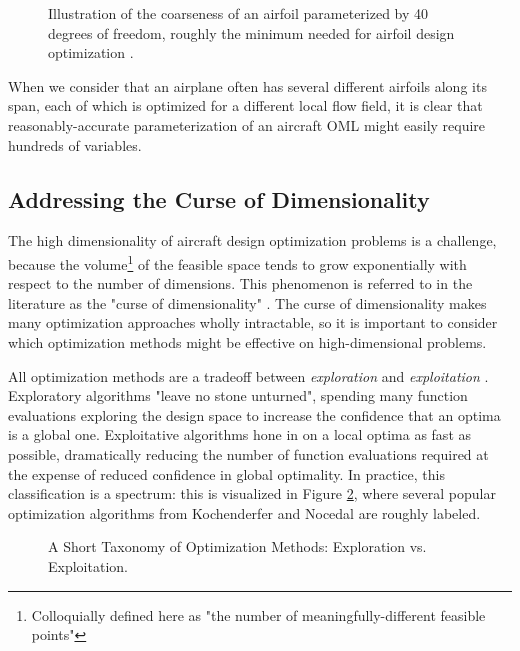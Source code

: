 \begin{figure}[H]
    \centering
    \ifdraft{}{}
    \caption{Illustration of the coarseness of an airfoil parameterized by 40 degrees of freedom\protect\footnotemark, roughly the minimum needed for airfoil design optimization \cite{masters2017}.}
    \label{fig:airfoil-fig}
\end{figure}

When we consider that an airplane often has several different airfoils along its span, each of which is optimized for a different local flow field, it is clear that reasonably-accurate parameterization of an aircraft OML might easily require hundreds of variables.

\subsection{Addressing the Curse of Dimensionality}

The high dimensionality of aircraft design optimization problems is a challenge, because the volume\footnote{Colloquially defined here as "the number of meaningfully-different feasible points"} of the feasible space tends to grow exponentially with respect to the number of dimensions. This phenomenon is referred to in the literature as the "curse of dimensionality" \cite{mdobook, mpk2017}. The curse of dimensionality makes many optimization approaches wholly intractable, so it is important to consider which optimization methods might be effective on high-dimensional problems.

All optimization methods are a tradeoff between \textit{exploration} and \textit{exploitation} \cite{faury2018, jasrasaria2018}. Exploratory algorithms "leave no stone unturned", spending many function evaluations exploring the design space to increase the confidence that an optima is a global one. Exploitative algorithms hone in on a local optima as fast as possible, dramatically reducing the number of function evaluations required at the expense of reduced confidence in global optimality. In practice, this classification is a spectrum: this is visualized in Figure \ref{fig:exploration-exploitation}, where several popular optimization algorithms from Kochenderfer \cite{koch2019} and Nocedal \cite{nocedal2006} are roughly labeled.

\begin{figure}[H]
    \centerline{}
    \caption{A Short Taxonomy of Optimization Methods: Exploration vs. Exploitation.}
    \label{fig:exploration-exploitation}
\end{figure}


